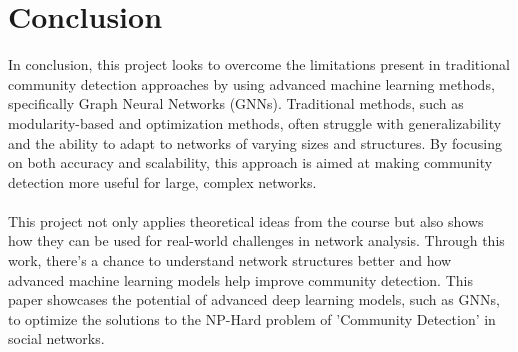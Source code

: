 \documentclass{article}
\begin{document}
\section{Conclusion}
In conclusion, this project looks to overcome the limitations present in traditional community detection approaches by using advanced machine learning methods, specifically Graph Neural Networks (GNNs). Traditional methods, such as modularity-based and optimization methods, often struggle with generalizability and the ability to adapt to networks of varying sizes and structures. By focusing on both accuracy and scalability, this approach is aimed at making community detection more useful for large, complex networks.\\\\ This project not only applies theoretical ideas from the course but also shows how they can be used for real-world challenges in network analysis. Through this work, there's a chance to understand network structures better and how advanced machine learning models help improve community detection. This paper showcases the potential of advanced deep learning models, such as GNNs, to optimize the solutions to the NP-Hard problem of 'Community Detection' in social networks.




\end{document}
